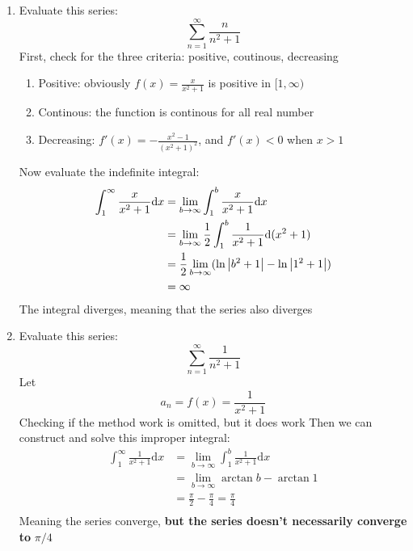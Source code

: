 \documentclass{article}
\numberwithin{equation}{section}
\begin{document}
\begin{enumerate}
    \item Evaluate this series:
    \[
        \sum_{n = 1}^{\infty} \frac{n}{n^2 + 1} 
    \]
    First, check for the three criteria: positive, coutinous, decreasing
    \begin{enumerate}
        \item Positive: obviously $f(x) = \frac{x}{x^2 + 1}$ is positive in $[1 , \infty)$
        \item Continous: the function is continous for all real number
        \item Decreasing: $f'(x) = -\frac{x^2 - 1}{(x^2 + 1)^2}$, and $f'(x) < 0$ when $x > 1$
    \end{enumerate}
    Now evaluate the indefinite integral:
    \[
        \begin{split}
            \int_{1}^{\infty} \frac{x}{x^2 + 1} \mathrm{d}x &= \lim_{b\to \infty} \int_{1}^{b} \frac{x}{x^2 + 1} \mathrm{d}x\\
            & = \lim_{b\to \infty} \frac{1}{2}\int_{1}^{b} \frac{1}{x^2 + 1} \mathrm{d}(x^2 + 1)\\
            & = \frac{1}{2} \lim_{b\to \infty} (\ln \abs{b^2 + 1} - \ln \abs{1^2 + 1})\\
            & = \infty
        \end{split}
    \]
    The integral diverges, meaning that the series also diverges

    \item Evaluate this series:
    \[
        \sum_{n = 1}^{\infty} \frac{1}{n^2 + 1}
    \]
    Let 
    \[
        a_n = f(x) = \frac{1}{x^2 + 1}
    \]
    Checking if the method work is omitted, but it does work
    Then we can construct and solve this improper integral:
    \[
        \begin{split}
            \int_{1}^{\infty} \frac{1}{x^2 + 1} \mathrm{d}x & = \lim_{b\to \infty} \int_{1}^{b} \frac{1}{x^2 + 1}\mathrm{d}x\\
            & = \lim_{b\to \infty} \arctan b - \arctan 1\\
            & = \frac{\pi}{2} - \frac{\pi}{4} = \frac{\pi}{4}\\
        \end{split}
    \]
    Meaning the series converge, \textbf{but the series doesn't necessarily converge to} $\pi/4$
\end{enumerate}
\end{document}
